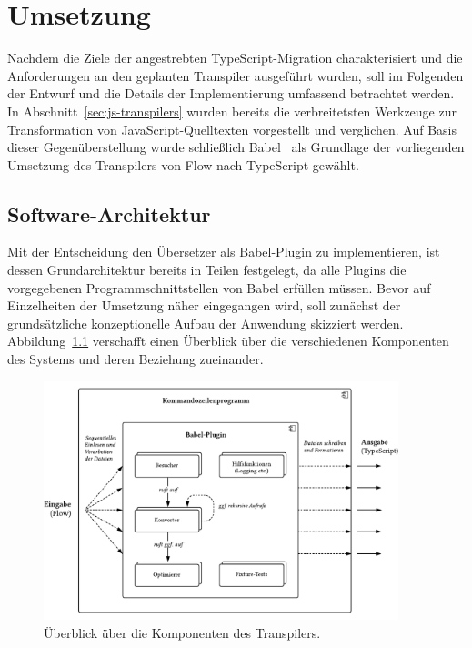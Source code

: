 \chapter{Umsetzung}
\label{chap:implementation}

Nachdem die Ziele der angestrebten TypeScript-Migration charakterisiert und die Anforderungen an den geplanten Transpiler ausgeführt wurden, soll im Folgenden der Entwurf und die Details der Implementierung umfassend betrachtet werden. In Abschnitt~\ref{sec:js-transpilers} wurden bereits die verbreitetsten Werkzeuge zur Transformation von JavaScript-Quelltexten vorgestellt und verglichen. Auf Basis dieser Gegenüberstellung wurde schließlich Babel~\autocite{BABEL} als Grundlage der vorliegenden Umsetzung des Transpilers von Flow nach TypeScript gewählt.

\section{Software-Architektur}
\label{sec:software-architecture}

Mit der Entscheidung den Übersetzer als Babel-Plugin zu implementieren, ist dessen Grundarchitektur bereits in Teilen festgelegt, da alle Plugins die vorgegebenen Programmschnittstellen von Babel erfüllen müssen. Bevor auf Einzelheiten der Umsetzung näher eingegangen wird, soll zunächst der grundsätzliche konzeptionelle Aufbau der Anwendung skizziert werden. Abbildung~\ref{fig:architecture-overview} verschafft einen Überblick über die verschiedenen Komponenten des Systems und deren Beziehung zueinander.

\begin{figure}[tbp]
  \centering
  \includegraphics[width=0.92\textwidth]{src/4_Umsetzung/fig/architecture-overview.pdf}
  \caption{Überblick über die Komponenten des Transpilers.}
  \label{fig:architecture-overview}
\end{figure}

